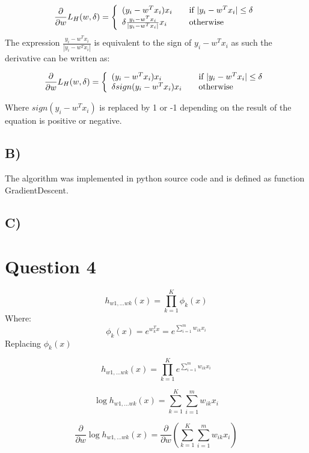 \documentclass{report}
\begin{document}
  \begin{equation}
    \frac{\partial}{\partial w} L_H(w, \delta) = \left\{
    \begin{array}{l l}
      (y_i - w^Tx_i) x_i & \quad \text{if }  | y_i - w^Tx_i | \leq \delta\\
      \delta \frac{y_i - w^Tx_i}{| y_i - w^Tx_i |} x_i & \quad \text{otherwise}

    \end{array} \right.\end{equation}
The expression $\frac{y_i - w^Tx_i}{| y_i - w^Tx_i |}$ is equivalent to the sign
of $y_i - w^Tx_i$ as such the derivative can be written as:

\begin{equation}
  \frac{\partial}{\partial w} L_H(w, \delta) = \left\{
  \begin{array}{l l}
    (y_i - w^Tx_i) x_i & \quad \text{if }  | y_i - w^Tx_i | \leq \delta\\
    \delta sign ( y_i - w^Tx_i ) x_i & \quad \text{otherwise}

  \end{array} \right.\end{equation}

Where $sign(y_i - w^Tx_i)$ is replaced by 1 or -1 depending on the result of the
equation is positive or negative.

\subsection*{B)}
The algorithm was implemented in python source code and is defined as function
GradientDescent.
\subsection*{C)}


\section*{Question 4}

  \begin{equation}
    h_{w1,...wk}(x)
    = \prod_{k=1}^{K}\phi_k(x)
  \end{equation}
Where:
  \begin{equation}
    \phi_k(x) = e^{w_k^Tx}
    = e^{\sum_{i=1}^m w_{ik}x_i}
  \end{equation}
Replacing $\phi_k(x)$

  \begin{equation}
    h_{w1,...wk}(x)
    = \prod_{k=1}^{K}e^{\sum_{i=1}^m w_{ik}x_i}
  \end{equation}

  \begin{equation}
    \log h_{w1,...wk}(x)
    = \sum_{k=1}^{K} \sum_{i=1}^m w_{ik}x_i
  \end{equation}

  \begin{equation}
    \frac{\partial}{\partial w} \log h_{w1,...wk}(x)
    = \frac{\partial}{\partial w} \left(\sum_{k=1}^{K} \sum_{i=1}^m w_{ik}x_i\right)
  \end{equation}
\end{document}

